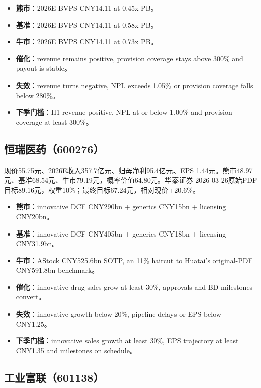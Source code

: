 \begin{itemize}
  \item \textbf{熊市}：2026E BVPS CNY14.11 at 0.45x PB。
  \item \textbf{基准}：2026E BVPS CNY14.11 at 0.58x PB。
  \item \textbf{牛市}：2026E BVPS CNY14.11 at 0.73x PB。
  \item \textbf{催化}：revenue remains positive, provision coverage stays above 300\% and payout is stable。
  \item \textbf{失效}：revenue turns negative, NPL exceeds 1.05\% or provision coverage falls below 280\%。
  \item \textbf{下季门槛}：H1 revenue positive, NPL at or below 1.00\% and provision coverage at least 300\%。
\end{itemize}

\subsection{恒瑞医药（600276）}

现价55.75元、2026E收入357.7亿元、归母净利95.4亿元、EPS 1.44元。熊市48.97元、基准68.54元、牛市79.19元，概率价值64.80元。华泰证券 2026-03-26原始PDF目标89.16元，权重10\%；最终目标67.24元，相对现价+20.6\%。

\begin{itemize}
  \item \textbf{熊市}：innovative DCF CNY290bn + generics CNY15bn + licensing CNY20bn。
  \item \textbf{基准}：innovative DCF CNY405bn + generics CNY18bn + licensing CNY31.9bn。
  \item \textbf{牛市}：AStock CNY525.6bn SOTP, an 11\% haircut to Huatai's original-PDF CNY591.8bn benchmark。
  \item \textbf{催化}：innovative-drug sales grow at least 30\%, approvals and BD milestones convert。
  \item \textbf{失效}：innovative growth below 20\%, pipeline delays or EPS below CNY1.25。
  \item \textbf{下季门槛}：innovative sales growth at least 30\%, EPS trajectory at least CNY1.35 and milestones on schedule。
\end{itemize}

\subsection{工业富联（601138）}

